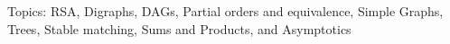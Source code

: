 \documentclass[quiz]{mcs}
\begin{document}

\begin{staffnotes}
Topics: RSA, Digraphs, DAGs, Partial orders and equivalence, Simple Graphs, 
Trees, Stable matching, Sums and Products, and Asymptotics 
\end{staffnotes}

















\end{document}
